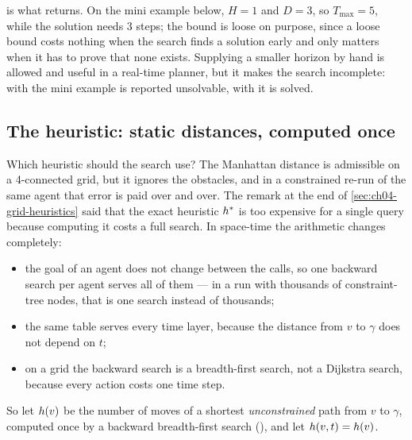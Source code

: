  is what  returns. On the mini
example below, $H = 1$ and $D = 3$, so $T_{\max} = 5$, while the solution needs
3 steps; the bound is loose on purpose, since a loose bound costs nothing when
the search finds a solution early and only matters when it has to prove that
none exists. Supplying a smaller horizon by hand is allowed and useful in a
real-time planner, but it makes the search incomplete: with
 the mini example is reported unsolvable, with
 it is solved.

\subsection{The heuristic: static distances, computed once}
\label{sec:ch04-static}

Which heuristic should the search use? The Manhattan distance is admissible on a
4-connected grid, but it ignores the obstacles, and in a constrained re-run of
the same agent that error is paid over and over. The remark at the end of
\cref{sec:ch04-grid-heuristics} said that the exact heuristic $h^*$ is too
expensive for a single query because computing it costs a full search. In
space-time the arithmetic changes completely:

\begin{itemize}
  \item the goal of an agent does not change between the calls, so one backward
        search per agent serves all of them --- in a \cbs run with thousands of
        constraint-tree nodes, that is one search instead of thousands;
  \item the same table serves every time layer, because the distance from $v$ to
        $\gamma$ does not depend on $t$;
  \item on a grid the backward search is a breadth-first search, not a
        Dijkstra search, because every action costs one time step.
\end{itemize}

So let $h(v)$ be the number of moves of a shortest \emph{unconstrained}
path from $v$ to $\gamma$, computed once by a backward breadth-first search
(), and let $h(v, t) = h(v)$.

